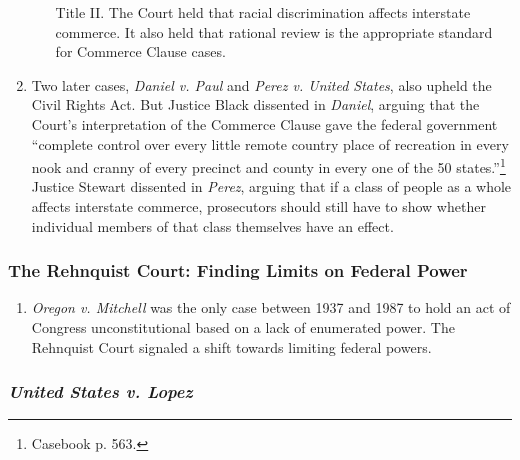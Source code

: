 \begin{enumerate}
\begin{enumerate}
        Title II. The Court held that racial discrimination affects interstate 
        commerce. It also held that rational review is the appropriate 
        standard for Commerce Clause cases.
    \end{enumerate}
    \item Two later cases, \emph{Daniel v. Paul} and \emph{Perez v. United 
    States}, also upheld the Civil Rights Act. But Justice Black dissented in 
    \emph{Daniel}, arguing that the Court's interpretation of the Commerce 
    Clause gave the federal government ``complete control over every little 
    remote country place of recreation in every nook and cranny of every 
    precinct and county in every one of the 50 states.''\footnote{Casebook p. 
    563.} Justice Stewart dissented in \emph{Perez}, arguing that if a class 
    of people as a whole affects interstate commerce, prosecutors should still 
    have to show whether individual members of that class themselves have an 
    effect.
\end{enumerate}

\subsubsection{The Rehnquist Court: Finding Limits on Federal Power}

\begin{enumerate}
    \item \emph{Oregon v. Mitchell} was the only case between 1937 and 1987 to 
    hold an act of Congress unconstitutional based on a lack of enumerated 
    power. The Rehnquist Court signaled a shift towards limiting federal 
    powers.
\end{enumerate}

\subsubsection{\emph{United States v. Lopez}}


